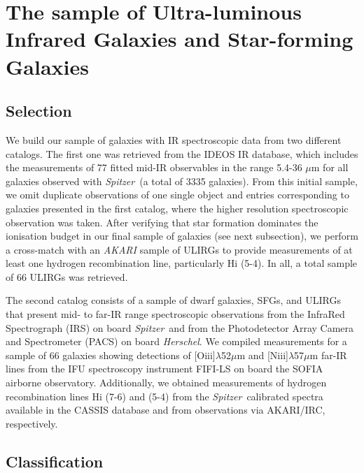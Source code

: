 \documentclass{nature2}
\newcommand{\spitzer}{{\it Spitzer}}
\newcommand{\herschel}{{\it Herschel}}
\begin{document}
\section{The sample of Ultra-luminous Infrared Galaxies and Star-forming Galaxies}
\label{sec:sample}
\subsection{Selection}
We build our sample of galaxies with IR spectroscopic data from two different catalogs. The first one was retrieved from the IDEOS\cite{HernanCaballero_2016, Spoon_2022} IR database, which includes the measurements of 77 fitted mid-IR observables in the range 5.4-36 $\mu$m for all galaxies observed with \spitzer\ (a total of 3335 galaxies\cite{Spoon_2022}). From this initial sample, we omit duplicate observations of one single object and entries corresponding to galaxies presented in the first catalog, where the %
higher resolution spectroscopic observation was taken. After verifying that star formation dominates the ionisation budget in our final sample of galaxies (see next subsection), we perform a cross-match with an {\it AKARI} sample of ULIRGs\cite{Inami_2018} to provide measurements of at least one hydrogen recombination line, particularly H{\sc i} (5-4). In all, a total sample of 66 ULIRGs was retrieved.

The second catalog\cite{FO21} consists of a sample of dwarf galaxies, SFGs, and ULIRGs that present mid- to far-IR range spectroscopic observations from the InfraRed Spectrograph (IRS\cite{Houck_2004}) on board \spitzer\ and from the Photodetector Array Camera and Spectrometer (PACS\cite{Poglitsch_2010}) on board \herschel\cite{FO21, FO16}. We compiled measurements for a sample of 66 galaxies showing detections of [O{\sc iii}]\ensuremath{\lambda}52\ensuremath{\mu}m and [N{\sc iii}]\ensuremath{\lambda}57\ensuremath{\mu}m far-IR lines\cite{Peng_2021} from the IFU spectroscopy instrument FIFI-LS\cite{Fischer_2018} on board the SOFIA airborne observatory. Additionally, we obtained measurements of hydrogen recombination lines H{\sc i} (7-6) and (5-4) from the \spitzer\ calibrated spectra available in the CASSIS\cite{Lebouteiller_2015} database and from observations via AKARI/IRC\cite{Imanishi_2010}, respectively.



\subsection{Classification}
\end{document}
